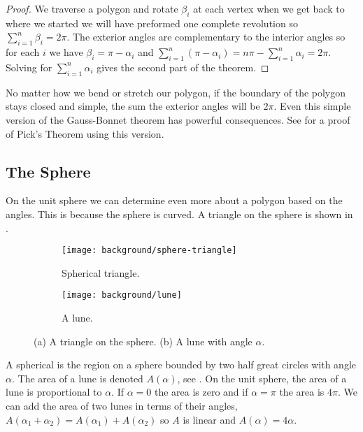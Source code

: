 \begin{proof}

	We traverse a polygon and rotate $\beta_i$ at each vertex
	when we get back to where we started we will have preformed 
	one complete revolution so $\sum_{i=1}^n\beta_i=2\pi.$
	The exterior angles are complementary to the interior angles
	so for each $i$ we have $\beta_i=\pi-\alpha_i$  and
	$\sum_{i=1}^n(\pi-\alpha_i)=n\pi -\sum_{i=1}^n\alpha_i=2\pi$. 
	Solving for $\sum_{i=1}^n\alpha_i$ gives the second part of the theorem.

\end{proof}


No matter how we bend or stretch our polygon,
if the boundary of the polygon stays closed and simple,
the sum the exterior angles will be $2\pi$.
Even this simple version of the Gauss-Bonnet theorem has powerful
consequences. See  for a proof of Pick's Theorem
using this version.




\subsection{The Sphere}
On the unit sphere we can determine even more about a polygon 
based on the angles. This is because the sphere is curved.
A triangle on the sphere is shown in .


 \begin{figure}[htb]
         \centering
        \begin{subfigure}[b]{0.35\textwidth}
         \texttt{[image: background/sphere-triangle]}
         \caption{Spherical triangle.}
 	 \label{fig:sphere-triangle}
       \end{subfigure}
         \hspace{1cm}
         \begin{subfigure}[b]{0.35\textwidth}
         \texttt{[image: background/lune]}
         \caption{A lune.}
          \label{fig:lune}
         \end{subfigure}
		\caption{(a) A triangle on the sphere.
 		(b) A lune with angle $\alpha$.
 		\label{fig:sphere-lune}}
 \end{figure}
A spherical  is the region on a sphere bounded by two half great circles
with angle $\alpha$. The area of a lune is denoted $A(\alpha)$,
 see .
On the unit sphere, the area of a lune is proportional to $\alpha$. 
If $\alpha=0$ the area is zero and if $\alpha=\pi$ the area is $4\pi$.
We can add the area of two lunes in terms of their angles, 
$A(\alpha_1+\alpha_2)=A(\alpha_1)+A(\alpha_2)$ so $A$ is linear
and  $A(\alpha)=4\alpha.$





